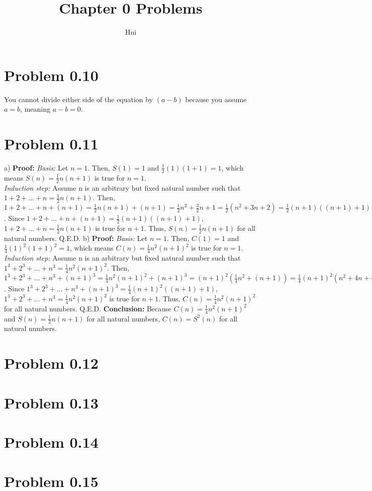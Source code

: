\documentclass{article}
\begin{document}
\title{Chapter 0 Problems}
\author{Hui}
\date{}
\maketitle

\section{Problem 0.10}
You cannot divide either side of the equation by $(a - b)$ because you assume $a = b$, meaning $a - b = 0$.

\section{Problem 0.11}
a) \textbf{Proof:} \textit{Basis:} Let $n = 1$. Then, $S(1) = 1$ and $\frac{1}{2}(1)(1 + 1) = 1$, which means $S(n) = \frac{1}{2}n(n+1)$ is true for $n = 1$.
\\\textit{Induction step:} Assume n is an arbitrary but fixed natural number such that $1 + 2 + ... + n = \frac{1}{2}n(n+1)$.
Then, $1 + 2 + ... + n + (n + 1) = \frac{1}{2}n(n+1) + (n + 1) = \frac{1}{2}n^2 + \frac{3}{2}n + 1 = \frac{1}{2}(n^2 + 3n + 2) = \frac{1}{2}(n + 1)((n + 1) + 1)$.
Since $1 + 2 + ... + n + (n + 1) = \frac{1}{2}(n + 1)((n + 1) + 1)$, $1 + 2 + ... + n = \frac{1}{2}n(n+1)$ is true for $n + 1$.
Thus, $S(n) = \frac{1}{2}n(n+1)$ for all natural numbers. Q.E.D.
\newline b) \textbf{Proof:} \textit{Basis:} Let $n = 1$. Then, $C(1) = 1$ and $\frac{1}{4}(1)^2(1 + 1)^2 = 1$, which means $C(n) = \frac{1}{4}n^2(n + 1)^2$ is true for $n = 1$.
\\\textit{Induction step:} Assume n is an arbitrary but fixed natural number such that $1^3 + 2^3 + ... + n^3 = \frac{1}{4}n^2(n+1)^2$.
Then, $1^3 + 2^3 + ... + n^3 + (n + 1)^3 = \frac{1}{4}n^2(n+1)^2 + (n + 1)^3 = (n + 1)^2(\frac{1}{4}n^2 + (n + 1)) = \frac{1}{4}(n + 1)^2(n^2 + 4n + 4) = \frac{1}{4}(n + 1)^2((n + 1) + 1)$.
Since $1^3 + 2^3 + ... + n^3 + (n + 1)^3 = \frac{1}{4}(n + 1)^2((n + 1) + 1)$, $1^3 + 2^3 + ... + n^3 = \frac{1}{4}n^2(n+1)^2$ is true for $n + 1$.
Thus, $C(n) = \frac{1}{4}n^2(n + 1)^2$ for all natural numbers. Q.E.D.
\newline \textbf{Conclusion:} Because $C(n) = \frac{1}{4}n^2(n + 1)^2$ and $S(n) = \frac{1}{2}n(n+1)$ for all natural numbers, $C(n) = S^2(n)$ for all natural numbers.
\section{Problem 0.12}

\section{Problem 0.13}

\section{Problem 0.14}

\section{Problem 0.15}
\end{document}
